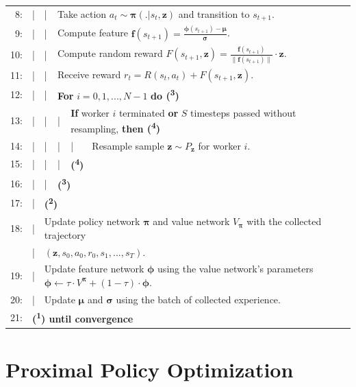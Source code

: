 {\begin{table}[h!]
\begin{tabular}{rlllll}
    8: & | & | & \multicolumn{3}{l}{Take action $a_{t} \sim \boldsymbol{\pi}(. | s_{t}, \textbf{z})$ and transition to $s_{t+1}$.}\\
    9: & | & | & \multicolumn{3}{l}{Compute feature $\textbf{f}(s_{t+1}) = \frac{\boldsymbol{\phi}(s_{t+1}) - \boldsymbol{\mu}}{\boldsymbol{\sigma}}$.}\\
    10: & | & | & \multicolumn{3}{l}{Compute random reward $F(s_{t+1}, \textbf{z}) = \frac{\textbf{f}(s_{t+1})}{\| \textbf{f}(s_{t+1}) \|} \cdot \textbf{z}$.}\\
    11: & | & | & \multicolumn{3}{l}{Receive reward $r_{t} = R(s_{t}, a_{t}) + F(s_{t+1}, \textbf{z})$.}\\
    12: & | & | & \multicolumn{3}{l}{\textbf{For} $i = 0, 1, ..., N-1$ \textbf{do (\textsuperscript{3})}}\\
    13: & | & | & | & \multicolumn{2}{l}{\textbf{If} worker $i$ terminated \textbf{or} $S$ timesteps passed without resampling, \textbf{then (\textsuperscript{4})}}\\
    14: & | & | & | & | & Resample sample $\textbf{z} \sim P_{\textbf{z}}$ for worker $i$.\\
    15: & | & | & | & \multicolumn{2}{l}{\textbf{(\textsuperscript{4})}}\\
    16: & | & | & \multicolumn{3}{l}{\textbf{(\textsuperscript{3})}}\\
    17: & | & \multicolumn{4}{l}{\textbf{(\textsuperscript{2})}}\\
    18: & | & \multicolumn{4}{l}{Update policy network $\boldsymbol{\pi}$ and value network $V_{\boldsymbol{\pi}}$ with the collected trajectory}\\
    & | & \multicolumn{4}{l}{$(\textbf{z}, s_{0}, a_{0}, r_{0}, s_{1}, ..., s_{T})$.}\\
    19: & | & \multicolumn{4}{l}{Update feature network $\boldsymbol{\phi}$ using the value network's parameters $\boldsymbol{\phi} \leftarrow \tau \cdot V^{\boldsymbol{\pi}} + (1 - \tau) \cdot \boldsymbol{\phi}$.}\\
    20: & | & \multicolumn{4}{l}{Update $\boldsymbol{\mu}$ and $\boldsymbol{\sigma}$ using the batch of collected experience.}\\
    21: & \multicolumn{5}{l}{\textbf{(\textsuperscript{1}) until convergence}}\\
    \hline\hline
  \end{tabular}
\end{table}}

\clearpage
\hypertarget{algo-ppo}{\section{Proximal Policy Optimization}}

